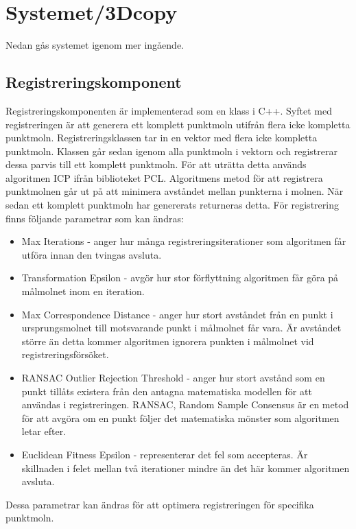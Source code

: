 \documentclass[a4paper,titlepage,12pt]{article}
\begin{document}
\section{Systemet/3Dcopy} %
	Nedan gås systemet igenom mer ingående.
	
	\subsection{Registreringskomponent}
		Registreringskomponenten är implementerad som en klass i C++. Syftet med registreringen är att generera ett komplett punktmoln utifrån flera icke kompletta punktmoln. Registreringsklassen tar in en vektor med flera icke kompletta punktmoln. Klassen går sedan igenom alla punktmoln i vektorn och registrerar dessa parvis till ett komplett punktmoln. För att uträtta detta används algoritmen ICP ifrån biblioteket PCL. Algoritmens metod för att registrera punktmolnen går ut på att minimera avståndet mellan punkterna i molnen. När sedan ett komplett punktmoln har genererats returneras detta. För registrering finns följande parametrar som kan ändras:
		
		\begin{itemize}
			\item Max Iterations - anger hur många registreringsiterationer som algoritmen får utföra innan den tvingas avsluta.
			\item Transformation Epsilon - avgör hur stor förﬂyttning algoritmen får göra på målmolnet inom en iteration. 
			
			\item Max Correspondence Distance - anger hur stort avståndet från en punkt i ursprungsmolnet till motsvarande punkt i målmolnet får vara. Är avståndet större än detta kommer algoritmen ignorera punkten i målmolnet vid registreringsförsöket. 
			
			\item RANSAC Outlier Rejection Threshold - anger hur stort avstånd som en punkt tillåts existera från den antagna matematiska modellen för att användas i registreringen. RANSAC, Random Sample Consensus är en metod för att avgöra om en punkt följer det matematiska mönster som algoritmen letar efter.
			
			\item Euclidean Fitness Epsilon - representerar det fel som accepteras. Är skillnaden i felet mellan två iterationer mindre än det här kommer algoritmen avsluta.
			 
		\end{itemize}
	Dessa parametrar kan ändras för att optimera registreringen för specifika punktmoln. 
	
\end{document}

